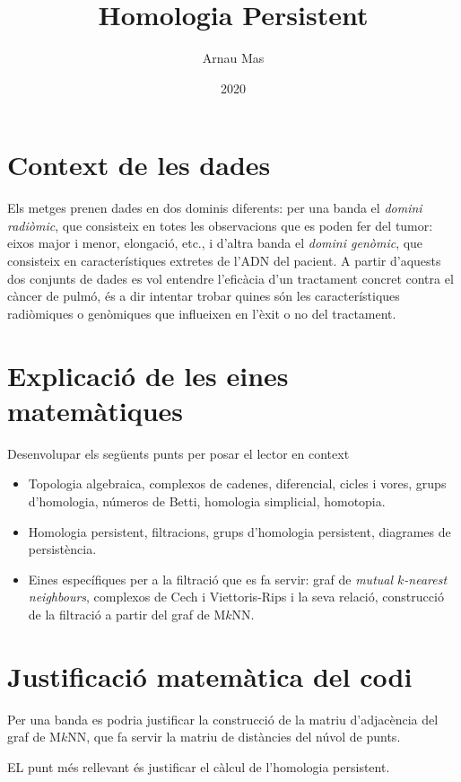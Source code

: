 \documentclass[12pt]{article}
\title{Homologia Persistent}
\author{Arnau Mas}
\date{2020}
\begin{document}
\maketitle

\section{Context de les dades}
Els metges prenen dades en dos dominis diferents: per una banda el \emph{domini radiòmic},
que consisteix en totes les observacions que es poden fer del tumor: eixos major i menor,
elongació, etc., i d'altra banda el \emph{domini genòmic}, que consisteix en
característiques extretes de l'ADN del pacient. A partir d'aquests dos conjunts de dades
es vol entendre l'eficàcia d'un tractament concret contra el càncer de pulmó, és a dir
intentar trobar quines són les característiques radiòmiques o genòmiques que influeixen en
l'èxit o no del tractament. 

\section{Explicació de les eines matemàtiques}
Desenvolupar els següents punts per posar el lector en context
\begin{itemize}
	\item Topologia algebraica, complexos de cadenes, diferencial, cicles i vores, grups
		d'homologia, números de Betti, homologia simplicial, homotopia. 
	\item Homologia persistent, filtracions, grups d'homologia persistent, diagrames de
		persistència.
	\item Eines específiques per a la filtració que es fa servir: graf de \emph{mutual \( k
		\)-nearest neighbours}, complexos de Cech i Viettoris-Rips i la seva relació,
		construcció de la filtració a partir del graf de M\( k \)NN. 
\end{itemize}

\section{Justificació matemàtica del codi}
Per una banda es podria justificar la construcció de la matriu d'adjacència del graf de
M\( k \)NN, que fa servir la matriu de distàncies del núvol de punts.

EL punt més rellevant és justificar el càlcul de l'homologia persistent. 
\end{document}

